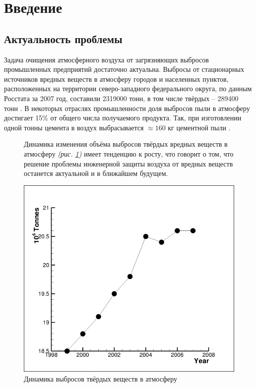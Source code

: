 \section*{Введение}
	\subsection*{Актуальность проблемы}
		\hspace{1em} 	Задача очищения атмосферного воздуха от загрязняющих выбросов промышленных предприятий достаточно актуальна. Выбросы от стационарных источников вредных веществ в атмосферу городов и населенных пунктов, расположенных на территории северо-западного федерального округа,  по данным Росстата за 2007 год,  составили 2319000 тонн, в том числе твёрдых -- 289400 тонн \cite{emissionInfoRussian}. В некоторых отраслях промышленности доля выбросов пыли в атмосферу достигает 15\% от общего числа получаемого продукта. Так, при изготовлении одной тонны цемента в воздух выбрасывается $\approx 160$ кг цементной пыли \cite{emissionInfoEurope}.
		\begin{figure}[ht]
			\begin{minipage}{0.46\linewidth}
				\vspace{-1em}
				Динамика изменения объёма выбросов твёрдых вредных веществ в атмосферу \textit{(рис. \ref{figure:atmosphereDynamic})} имеет тенденцию к росту, что говорит о том, что решение проблемы инженерной защиты воздуха от вредных веществ останется актуальной и в ближайшем будущем. 
			\end{minipage}
			\hspace{0.01\linewidth}
			\begin{minipage}{0.48\linewidth}
				\centering
				\includegraphics[scale=0.23]{atmosphereDynamic}
				\caption{Динамика выбросов твёрдых веществ в атмосферу \cite{emissionInfoRussian}}
				\label{figure:atmosphereDynamic}
			\end{minipage}
		\end{figure}
		\vspace{-1em}
	
